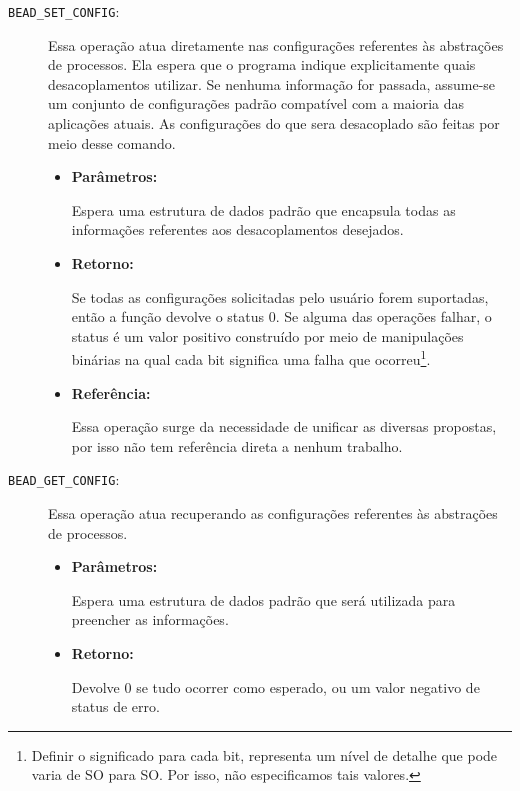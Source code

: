 \begin{description}
  \item [\texttt{BEAD\_SET\_CONFIG}:]

Essa operação atua diretamente nas configurações referentes às abstrações de
processos. Ela espera que o programa indique explicitamente quais
desacoplamentos utilizar. Se nenhuma informação for passada, assume-se um
conjunto de configurações padrão compatível com a maioria das aplicações
atuais. As configurações do que sera desacoplado são feitas por meio desse comando.

  \begin{itemize}
    \item \textbf{Parâmetros:}

Espera uma estrutura de dados padrão que encapsula todas as informações
referentes aos desacoplamentos desejados.

    \item \textbf{Retorno:}

Se todas as configurações solicitadas pelo usuário forem suportadas, então a
função devolve o status 0. Se alguma das operações falhar, o status é um valor
positivo construído por meio de manipulações binárias na qual cada bit
significa uma falha que ocorreu\footnote{Definir o significado para cada bit,
representa um nível de detalhe que pode varia de SO para SO. Por isso, não
especificamos tais valores.}. 

    \item \textbf{Referência:}

Essa operação surge da necessidade de unificar as diversas propostas, por isso
não tem referência direta a nenhum trabalho.

	\end{itemize}

  \item [\texttt{BEAD\_GET\_CONFIG}:]

Essa operação atua recuperando as configurações referentes às abstrações de
processos. 

  \begin{itemize}
    \item \textbf{Parâmetros:}

Espera uma estrutura de dados padrão que será utilizada para preencher as
informações.

    \item \textbf{Retorno:}

Devolve 0 se tudo ocorrer como esperado, ou um valor negativo de status de
erro.


\end{itemize}
\end{description}
